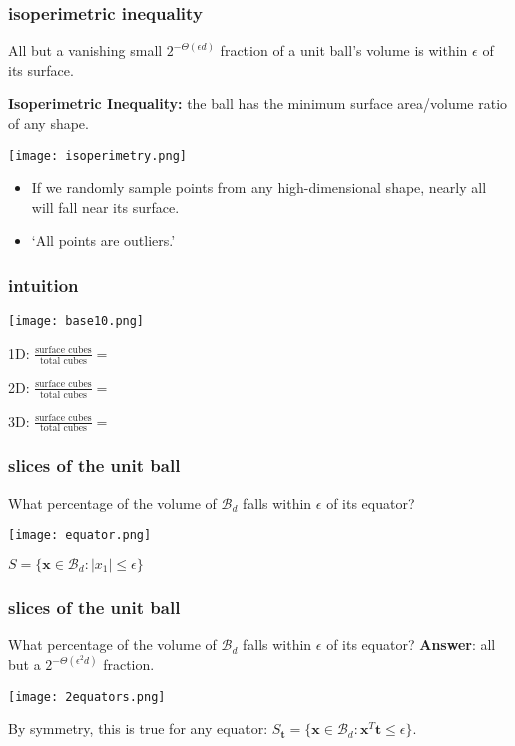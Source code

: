\documentclass[compress]{beamer}
\newcommand{\bv}[1]{\mathbf{#1}}
\begin{document}
\begin{frame}[t]
	\frametitle{isoperimetric inequality}
	All but a vanishing small $2^{-\Theta(\epsilon d)}$ fraction of a unit ball's volume is within $\epsilon$ of its surface.
	
	\textbf{Isoperimetric Inequality:} the ball has the minimum surface
	area/volume ratio of any shape.
	\begin{center}
	\texttt{[image: isoperimetry.png]}
	\end{center}
	\begin{itemize}
	\item If we randomly sample points from any high-dimensional shape,
	nearly all will fall near its surface.
	\item  ‘All points are outliers.’ 
	\end{itemize}
\end{frame}

\begin{frame}[t]
	\frametitle{intuition}
	\begin{center}
		\texttt{[image: base10.png]}
	\end{center}
	\vspace{-1em}
	1D: $\frac{\text{surface cubes}}{\text{total cubes}} = $
	\vspace{1em}

	2D: $\frac{\text{surface cubes}}{\text{total cubes}} = $
	\vspace{1em}
	
	3D: $\frac{\text{surface cubes}}{\text{total cubes}} = $
\end{frame}

\begin{frame}[t]
	\frametitle{slices of the unit ball}
	\alert{What percentage of the volume of $\mathcal{B}_d$ falls within $\epsilon$ of its equator?} 
	
	\begin{center}
		\texttt{[image: equator.png]}
		
		$S = \{\bv{x}\in \mathcal{B}_d: |x_1|\leq \epsilon\}$
	\end{center}
\end{frame}

\begin{frame}[t]
	\frametitle{slices of the unit ball}
	\alert{What percentage of the volume of $\mathcal{B}_d$ falls within $\epsilon$ of its equator?} \textbf{Answer}: all but a $2^{-\Theta(\epsilon^2 d)}$ fraction.
	\vspace{-.5em}
	\begin{center}
		\texttt{[image: 2equators.png]}
		
		\vspace{-.5em}
		By symmetry, this is true for any equator: $S_{\bv{t}} = \{\bv{x}\in \mathcal{B}_d: \bv{x}^T\bv{t}\leq \epsilon\}$.
	\end{center}
\end{frame}
\end{document}
